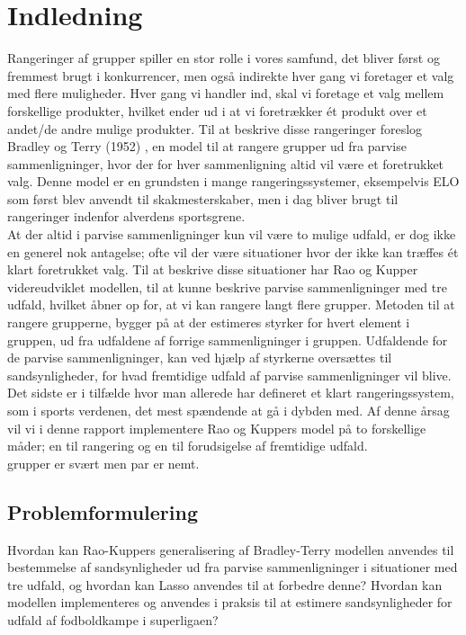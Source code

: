 \documentclass[11pt,a4paper]{article}
\begin{document}
\section{Indledning}
Rangeringer af grupper spiller en stor rolle i vores samfund, det bliver først og fremmest brugt i konkurrencer, men også indirekte hver gang vi foretager et valg med flere muligheder. Hver gang vi handler ind, skal vi foretage et valg mellem forskellige produkter, hvilket ender ud i at vi foretrækker ét produkt over et andet/de andre mulige produkter. Til at beskrive disse rangeringer foreslog Bradley og Terry (1952) \cite{BradleyTerry}, en model til at rangere grupper ud fra parvise sammenligninger, hvor der for hver sammenligning altid vil være et foretrukket valg. Denne model er en grundsten i mange rangeringssystemer, eksempelvis ELO som først blev anvendt til skakmesterskaber, men i dag bliver brugt til rangeringer indenfor alverdens sportsgrene. \\
At der altid i parvise sammenligninger kun vil være to mulige udfald, er dog ikke en generel nok antagelse; ofte vil der være situationer hvor der ikke kan træffes ét klart foretrukket valg. Til at beskrive disse situationer har Rao og Kupper \cite{RaoKupper} videreudviklet modellen, til at kunne beskrive parvise sammenligninger med tre udfald, hvilket åbner op for, at vi kan rangere langt flere grupper. Metoden til at rangere grupperne, bygger på at der estimeres styrker for hvert element i gruppen, ud fra udfaldene af forrige sammenligninger i gruppen. Udfaldende for de parvise sammenligninger, kan ved hjælp af styrkerne oversættes til sandsynligheder, for hvad fremtidige udfald af parvise sammenligninger vil blive. Det sidste er i tilfælde hvor man allerede har defineret et klart rangeringssystem, som i sports verdenen, det mest spændende at gå i dybden med. Af denne årsag vil vi i denne rapport implementere Rao og Kuppers model på to forskellige måder; en til rangering og en til forudsigelse af fremtidige udfald. \\


grupper er svært men par er nemt. 
\subsection{Problemformulering}
Hvordan kan Rao-Kuppers generalisering af Bradley-Terry modellen anvendes til bestemmelse af sandsynligheder ud fra parvise sammenligninger i situationer med tre udfald, og hvordan kan Lasso anvendes til at forbedre denne? Hvordan kan modellen implementeres og anvendes i praksis til at estimere sandsynligheder for udfald af fodboldkampe i superligaen? 
\end{document}
